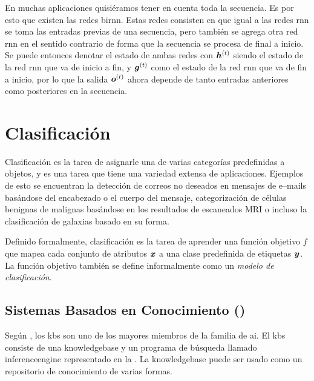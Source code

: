 En muchas aplicaciones quisiéramos tener en cuenta toda la secuencia. Es por esto que existen las redes \gls{birnn}. Estas redes consisten en que igual a las redes \gls{rnn} se toma las entradas previas de una secuencia, pero también se agrega otra red \gls{rnn} en el sentido contrario de forma que la secuencia se procesa de final a inicio. Se puede entonces denotar el estado de ambas redes con ${\bm{h}}^{(t)}$ siendo el estado de la red \gls{rnn} que va de inicio a fin, y ${\bm{g}}^{(t)}$ como el estado de la red \gls{rnn} que va de fin a inicio, por lo que la salida ${\bm{o}}^{(t)}$ ahora depende de tanto entradas anteriores como posteriores en la secuencia.


\section{Clasificación} \label{subsec:clasification}
Clasificación es la tarea de asignarle una de varias categorías predefinidas a objetos, y es una tarea que tiene una variedad extensa de aplicaciones. Ejemplos de esto se encuentran la detección de correos no deseados en mensajes de e--mails basándose del encabezado o el cuerpo del mensaje, categorización de células benignas de malignas basándose en los resultados de escaneados MRI o incluso la clasificación de galaxias basado en su forma.

Definido formalmente, clasificación es la tarea de aprender una función objetivo $f$ que mapea cada conjunto de atributos ${\bm{x}}$ a una clase predefinida de etiquetas ${\bm{y}}$. La función objetivo también se define informalmente como un \emph{modelo de clasificación}.


\subsection{Sistemas Basados en Conocimiento ()} \label{sec:KBS}
Según \cite{sajja2010knowledge}, los \gls{kbs} son uno de los mayores miembros de la familia de \gls{ai}. El \gls{kbs} consiste de una \gls{knowledgebase} y un programa de búsqueda llamado \gls{inferenceengine} representado en la . La \gls{knowledgebase} puede ser usado como un repositorio de conocimiento de varias formas.

